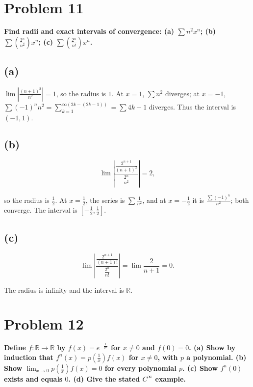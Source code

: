 \section{Problem 11}

\textbf{Find radii and exact intervals of convergence: (a) \(\sum n^{2}x^{n}\); (b) \(\sum\left( \frac{2^{n}}{n^{2}} \right)x^{n}\); (c) \(\sum\left( \frac{2^{n}}{n!} \right)x^{n}\).}

\subsection{(a)}

\(\lim\left| \frac{\left( {n + 1} \right)^{2}}{n^{2}} \right| = 1\), so the radius is \(1\). At \(x = 1\), \(\sum n^{2}\) diverges; at \(x = - 1\), \({\sum\left( {- 1} \right)}^{n}n^{2} = \sum_{k = 1}^{\infty{({2k - {({2k - 1})}})}} = \sum 4k - 1\) diverges. Thus the interval is \(\left( {- 1,1} \right)\).

\subsection{(b)}

\[\lim\left| \frac{\frac{2^{n + 1}}{\left( {n + 1} \right)^{2}}}{\frac{2^{n}}{n^{2}}} \right| = 2,\]

so the radius is \(\frac{1}{2}\). At \(x = \frac{1}{2}\), the series is \(\sum\frac{1}{n^{2}}\), and at \(x = - \frac{1}{2}\) it is \(\frac{{\sum\left( {- 1} \right)}^{n}}{n^{2}}\); both converge. The interval is \(\left\lbrack {- \frac{1}{2},\frac{1}{2}} \right\rbrack\).

\subsection{(c)}

\[\lim\left| \frac{\frac{2^{n + 1}}{\left( {n + 1} \right)!}}{\frac{2^{n}}{n!}} \right| = \lim\frac{2}{n + 1} = 0.\]

The radius is infinity and the interval is \(\mathbb{R}\).

\section{Problem 12}

\textbf{Define \(f:\mathbb{R}\rightarrow\mathbb{R}\) by \(f(x) = e^{- \frac{1}{x^{2}}}\) for \(x \neq 0\) and \(f(0) = 0\). (a) Show by induction that \(f^{n}(x) = p\left( \frac{1}{x} \right)f(x)\) for \(x \neq 0\), with \(p\) a polynomial. (b) Show \(\lim_{x\rightarrow 0}p\left( \frac{1}{x} \right)f(x) = 0\) for every polynomial \(p\). (c) Show \(f^{n}(0)\) exists and equals \(0\). (d) Give the stated \(C^{\infty}\) example.}

